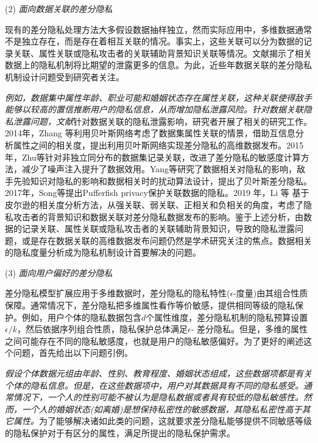 (2) {\em 面向数据关联的差分隐私}

现有的差分隐私处理方法大多假设数据抽样独立，然而实际应用中，多维数据通常不是独立存在，而是存在着相互关联的情况。事实上，这些关联可以分为数据的记录关联、属性关联或隐私攻击者的关联辅助背景知识关联等情况。文献揭示了相关数据上的隐私机制将比期望的泄露更多的信息。为此，近些年数据关联的差分隐私机制设计问题受到研究者关注。

{\em 例如，数据集中属性年龄、职业可能和婚姻状态存在属性关联，这种关联使得敌手能够以较高的置信推断用户的隐私信息，从而增加隐私泄露风险。针对数据关联隐私泄露问题，文献}针对数据关联的隐私泄露影响，研究者开展了相关的研究工作。
2014年，Zhang 等\cite{zhang2014privbayes}利用贝叶斯网络考虑了数据集属性关联的情景，借助互信息分析属性之间的相关度\cite{reshef2011detecting,liangjy2016}，提出利用贝叶斯网络实现差分隐私的高维数据发布。2015年，Zhu等\cite{zhu2015correlated}针对非独立同分布的数据集记录关联，改进了差分隐私的敏感度计算方法，减少了噪声注入提升了数据效用。Yang等\cite{yang2015bayesian}研究了数据相关对隐私的影响，敌手先验知识对隐私的影响和数据相关时的扰动算法设计，提出了贝叶斯差分隐私。2017年，Song等\cite{song2017pufferfish}提出Pufferfish privacy保护关联数据的隐私。2019 年，Li 等\cite{li2019impact} 基于皮尔逊的相关度分析方法，从强关联、弱关联、正相关和负相关的角度，考虑了隐私攻击者的背景知识和数据关联对差分隐私数据发布的影响。鉴于上述分析，由数据的记录关联、属性关联或隐私攻击者的关联辅助背景知识，导致的隐私泄露问题，或是存在数据关联的高维数据发布问题仍然是学术研究关注的焦点。数据相关的隐私度量分析成为隐私机制设计首要解决的问题。

(3) {\em 面向用户偏好的差分隐私}

差分隐私模型扩展应用于多维数据时，差分隐私的隐私特性($\epsilon$-度量)由其组合性质保障。通常情况下，差分隐私把多维属性看作等价敏感，提供相同等级的隐私保护。例如，用户个体的隐私数据包含$d$个属性维度，差分隐私机制的隐私预算设置$\epsilon/k$，然后依据序列组合性质，隐私保护总体满足$\epsilon$- 差分隐私。但是，多维的属性之间可能存在不同的隐私敏感度，也就是用户的隐私敏感偏好。为了更好的阐述这个问题，首先给出以下问题引例。

{\em 假设个体数据元组由年龄、性别、教育程度、婚姻状态组成，这些数据项都是有关个体的隐私信息。但是，在这些数据项中，用户对其数据具有不同的隐私感受。通常情况下，一个人的性别可能不被认为是隐私数据或者具有较低的隐私敏感性。然而，一个人的婚姻状态(如离婚)是想保持私密性的敏感数据，其隐私私密性高于其它属性。}为了能够解决诸如此类的问题，这就要求差分隐私能够提供不同敏感等级的隐私保护对于有区分的属性，满足所提出的隐私保护需求。

